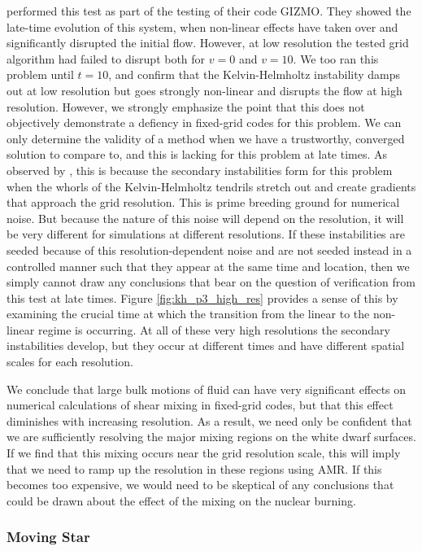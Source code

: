 \documentclass[iop]{emulateapj}
\begin{document}
\citet{hopkins:2014} performed this test as part of the testing of their code GIZMO. 
They showed the late-time evolution of this system, when non-linear effects have 
taken over and significantly disrupted the initial flow. However, at low resolution the 
tested grid algorithm had failed to disrupt both for $v = 0$ and $v = 10$. We too ran 
this problem until $t = 10$, and confirm that the Kelvin-Helmholtz instability damps out 
at low resolution but goes strongly non-linear and disrupts the flow at high resolution.
However, we strongly emphasize the point that this does not objectively 
demonstrate a defiency in fixed-grid codes for this problem. We can only determine 
the validity of a method when we have a trustworthy, converged solution to compare to, and 
this is lacking for this problem at late times. As observed by \citeauthor{mcnally:2012}, 
this is because the secondary instabilities form for this problem when the whorls of 
the Kelvin-Helmholtz tendrils stretch out and create gradients that approach the 
grid resolution. This is prime breeding ground for numerical noise. But because 
the nature of this noise will depend on the resolution, it will be very different for 
simulations at different resolutions. If these instabilities are seeded because of 
this resolution-dependent noise and are not seeded instead in a controlled manner 
such that they appear at the same time and location, then we simply cannot draw 
any conclusions that bear on the question of verification from this test at late times. 
Figure \ref{fig:kh_p3_high_res} provides a sense of this by examining the crucial 
time at which the transition from the linear to the non-linear regime is occurring. 
At all of these very high resolutions the secondary instabilities develop, but they 
occur at different times and have different spatial scales for each resolution.

We conclude that large bulk motions of fluid can have very significant effects 
on numerical calculations of shear mixing in fixed-grid codes, but that this effect 
diminishes with increasing resolution. As a result, we need only be confident that we are 
sufficiently resolving the major mixing regions on the white dwarf surfaces. 
If we find that this mixing occurs near the grid resolution scale, this will imply 
that we need to ramp up the resolution in these regions using AMR. If this becomes 
too expensive, we would need to be skeptical of any conclusions that could be drawn 
about the effect of the mixing on the nuclear burning.

\subsubsection{Moving Star}\label{sec:moving_star}
\end{document}
